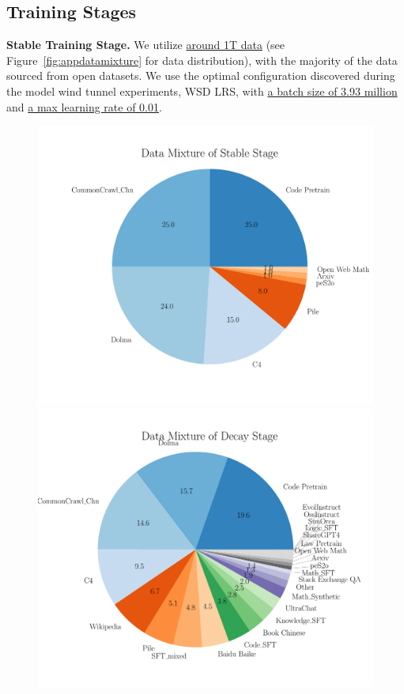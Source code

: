 \subsection{Training Stages} 

\textbf{Stable Training Stage.}
We utilize \uline{around 1T data} (see Figure~\ref{fig:appdatamixture} for data distribution), with the majority of the data sourced from open datasets. We use the optimal configuration discovered during the model wind tunnel experiments, WSD LRS, with \uline{a batch size of 3.93 million} and \uline{a max learning rate of 0.01}.

\begin{figure}[htbp]
    \centering
    \begin{minipage}{0.48\linewidth}
        \centering
        \includegraphics[width=1.0\linewidth]{Fig/stable_mixture.pdf}
    \end{minipage}
    \hfill 
    \begin{minipage}{0.48\linewidth}
        \centering
        \includegraphics[width=1.0\linewidth]{Fig/decay_data_mixture.pdf}

\end{minipage}
\end{figure}
